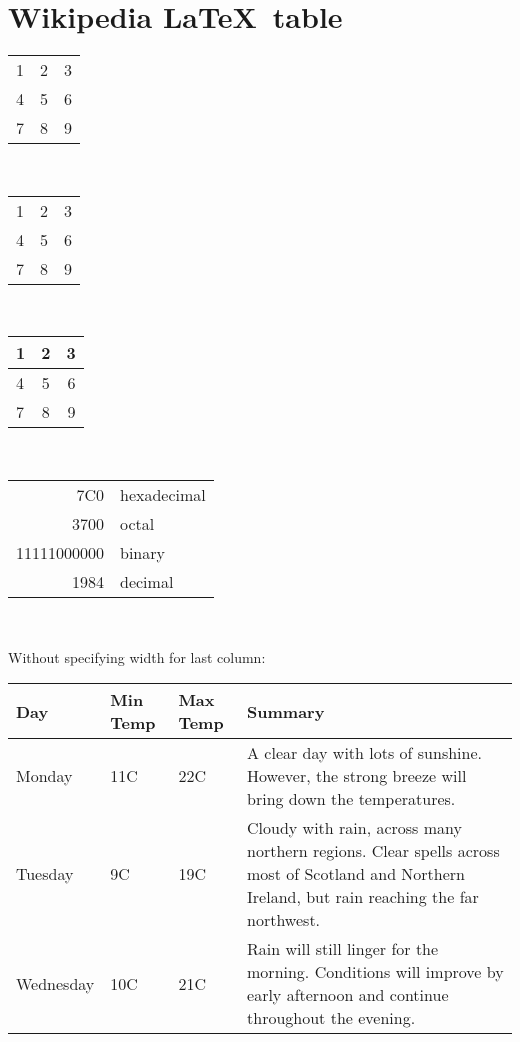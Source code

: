 \documentclass[11pt]{article}
\begin{document}
\section*{Wikipedia \LaTeX\ table}

\begin{tabular}{ l c r }
  1 & 2 & 3 \\
  4 & 5 & 6 \\
  7 & 8 & 9 \\
\end{tabular}
\\[6pt]

\begin{tabular}{ l | c | r }
  \hline			
  1 & 2 & 3 \\
  4 & 5 & 6 \\
  7 & 8 & 9 \\
  \hline  
\end{tabular}
\\[6pt]

\begin{center}
  \begin{tabular}{ l | c | r }
    \hline
    1 & 2 & 3 \\ \hline
    4 & 5 & 6 \\ \hline
    7 & 8 & 9 \\
    \hline
  \end{tabular}\\[6pt]
\end{center}

\begin{tabular}{|r|l|}
  \hline
  7C0 & hexadecimal \\
  3700 & octal \\ \cline{2-2}
  11111000000 & binary \\
  \hline \hline
  1984 & decimal \\
  \hline
\end{tabular}\\[6pt]

\newpage

Without specifying width for last column:
\begin{center}
    \begin{tabular}{| l | l | l | l |}
    \hline
    Day & Min Temp & Max Temp & Summary \\ \hline
    Monday & 11C & 22C & A clear day with lots of sunshine.
    However, the strong breeze will bring down the temperatures. \\ \hline
    Tuesday & 9C & 19C & Cloudy with rain, across many northern regions. Clear spells 
    across most of Scotland and Northern Ireland, 
    but rain reaching the far northwest. \\ \hline
    Wednesday & 10C & 21C & Rain will still linger for the morning. 
    Conditions will improve by early afternoon and continue 
    throughout the evening. \\
    \hline
    \end{tabular}
\end{center}
\end{document}
